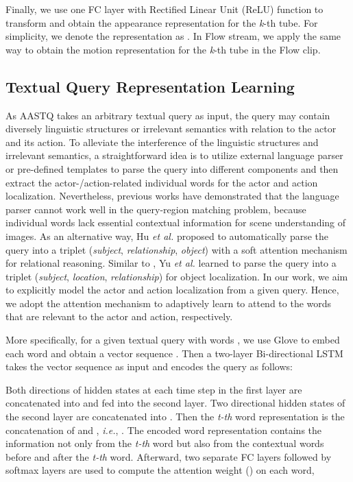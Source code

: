 \documentclass[journal]{IEEEtran}
\begin{document}
Finally, we use one FC layer with Rectified Linear Unit (ReLU) function to transform  and obtain the appearance representation for the \emph{k}-th tube. For simplicity, we denote the representation as  . In Flow stream, we apply the same way to obtain the motion representation   for the \emph{k}-th tube in the Flow clip.


\subsection{Textual Query Representation Learning}
\label{section: attn_learn}

As AASTQ takes an arbitrary textual query as input, the query may contain diversely linguistic structures or irrelevant semantics with relation to the actor and its action. To alleviate the interference of the linguistic structures and irrelevant semantics, a straightforward idea is to utilize external language parser \cite{socher2013parsing,andreas2016learning} or pre-defined templates \cite{kazemzadeh2014referitgame} to parse the query into different components and then extract the actor-/action-related individual words for the actor and action localization. Nevertheless, previous works \cite{hu2017modeling,yu2018mattnet,2020graph} have demonstrated that the language parser cannot work well in the query-region matching problem, because individual words lack essential contextual information for scene understanding of images. As an alternative way, Hu \emph{et al.} \cite{hu2017modeling} proposed to automatically parse the query into a triplet (\emph{subject}, \emph{relationship}, \emph{object}) with a soft attention mechanism for relational reasoning. Similar to \cite{hu2017modeling}, Yu \emph{et al.} \cite{yu2018mattnet} learned to parse the query into a triplet (\emph{subject}, \emph{location}, \emph{relationship}) for object localization. In our work, we aim to explicitly model the actor and action localization from a given query. Hence, we adopt the attention mechanism to adaptively learn to attend to the words that are relevant to the actor and action, respectively.

More specifically, for a given textual query with  words , we use Glove \cite{pennington2014glove} to embed each word and obtain a vector sequence  . Then a two-layer Bi-directional LSTM \cite{schuster1997bidirectional} takes the vector sequence  as input and encodes the query as follows:




Both directions of hidden states at each time step in the first layer are concatenated into  and fed into the second layer. Two directional hidden states of the second layer are concatenated into . Then the \emph{t-th} word representation is the concatenation of  and , \emph{i.e.},   . The encoded word representation  contains the information not only from the \emph{t-th} word but also from the contextual words before and after the \emph{t-th} word. Afterward, two separate FC layers followed by softmax layers are used to compute the attention weight  () on each word,
\end{document}
